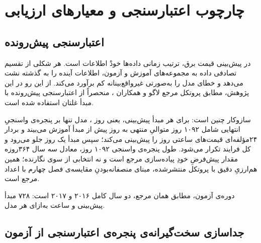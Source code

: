 
\section{چارچوب اعتبارسنجی و معیارهای ارزیابی}
\label{sec:3-5}

\subsection*{اعتبارسنجی پیش‌رونده}

در پیش‌بینی قیمت برق، ترتیب زمانی داده‌ها خودْ اطلاعات است. هر شکلی از تقسیم تصادفی
داده به مجموعه‌های آموزش و آزمون، اطلاعات آینده را به گذشته نشت می‌دهد و خطای مدل را
به‌صورتی غیرواقع‌بینانه کم برآورد می‌کند. از این رو در این پژوهش، مطابق پروتکل مرجع
لاگو و همکاران \cite{lago_forecasting_2021}، منحصراً از اعتبارسنجی پیش‌رونده با مبدأ
غلتان استفاده شده است.

سازوکار چنین است: برای هر مبدأ پیش‌بینی، یعنی روز ، مدل تنها بر پنجره‌ی واسنجیِ
انتهایی شامل ۱۰۹۲ روز متوالیِ منتهی به روز پیش از مبدأ آموزش می‌بیند و بردار
۲۴مؤلفه‌ای قیمت‌های ساعتی روز  را پیش‌بینی می‌کند؛ سپس مبدأ یک روز جلو می‌رود
و کل فرایند تکرار می‌شود. طول پنجره‌ی واسنجی  ۱۰۹۲ روز، معادل سه سال ۳۶۴روزه
 مقدار پیش‌فرضِ خودِ پیاده‌سازی مرجع است و نه انتخابی از سوی نگارنده؛ همین
هم‌ارزیِ دقیق با پروتکل منتشرشده، مبنای منصفانه‌بودنِ مقایسه‌ی فصل چهارم با اعداد مرجع
است.

دوره‌ی آزمون، مطابق همان مرجع، دو سال کامل ۲۰۱۶ و ۲۰۱۷ است: ۷۲۸ مبدأ پیش‌بینی و
 ساعت به‌ازای هر مدل.

\subsection*{جداسازی سخت‌گیرانه‌ی پنجره‌ی اعتبارسنجی از آزمون}


